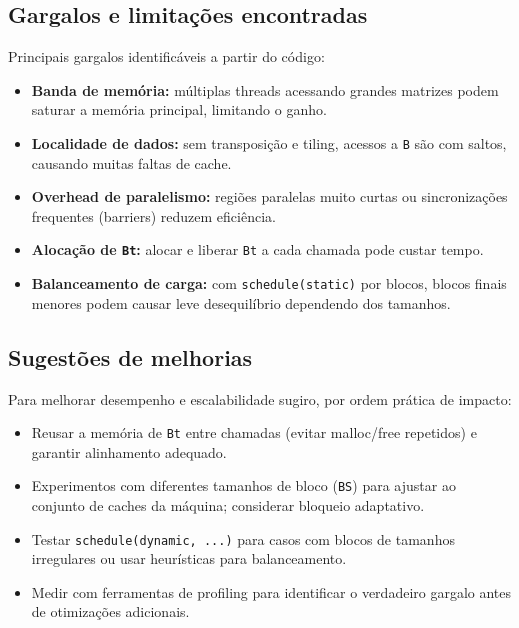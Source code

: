 \documentclass[12pt, a4paper]{article}
\begin{document}
	\subsection{Gargalos e limitações encontradas}
	Principais gargalos identificáveis a partir do código:
	\begin{itemize}
		\item \textbf{Banda de memória:} múltiplas threads acessando grandes matrizes podem saturar a memória principal, limitando o ganho.

		\item \textbf{Localidade de dados:} sem transposição e tiling, acessos a \texttt{B} são com saltos, causando muitas faltas de cache.
		
		\item \textbf{Overhead de paralelismo:} regiões paralelas muito curtas ou sincronizações frequentes (barriers) reduzem eficiência.
		
		\item \textbf{Alocação de \texttt{Bt}:} alocar e liberar \texttt{Bt} a cada chamada pode custar tempo.
		
		\item \textbf{Balanceamento de carga:} com \texttt{schedule(static)} por blocos, blocos finais menores podem causar leve desequilíbrio dependendo dos tamanhos.
	\end{itemize}

	\subsection{Sugestões de melhorias}
	Para melhorar desempenho e escalabilidade sugiro, por ordem prática de impacto:
	\begin{itemize}
		\item Reusar a memória de \texttt{Bt} entre chamadas (evitar malloc/free repetidos) e garantir alinhamento adequado.
		
		\item Experimentos com diferentes tamanhos de bloco (\texttt{BS}) para ajustar ao conjunto de caches da máquina; considerar bloqueio adaptativo.
		
		\item Testar \texttt{schedule(dynamic, ...)} para casos com blocos de tamanhos irregulares ou usar heurísticas para balanceamento.

		\item Medir com ferramentas de profiling para identificar o verdadeiro gargalo antes de otimizações adicionais.
	\end{itemize}
\end{document}
